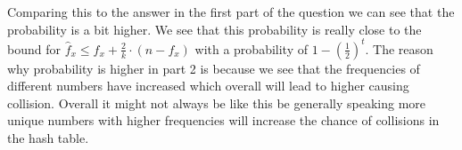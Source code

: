\documentclass{article}
\begin{document}
\noindent Comparing this to the answer in the first part of the question we can see that the probability is a bit higher. We see that this probability is really close to the bound for \(\hat{f}_x \leq f_x + \frac{2}{k} \cdot (n - f_x)\) with a probability of \(1-\left(\frac{1}{2}\right)^t\). The reason why probability is higher in part 2 is because we see that the frequencies of different numbers have increased which overall will lead to higher causing collision. Overall it might not always be like this be generally speaking more unique numbers with higher frequencies will increase the chance of collisions in the hash table.

\newpage


\end{document}
